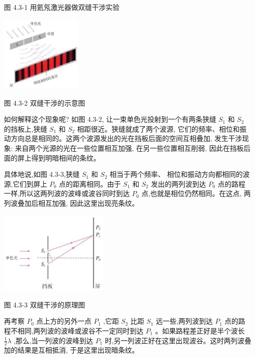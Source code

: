 \documentclass[10pt]{article}
\begin{document}
图 4.3-1 用氦氖激光器做双缝干涉实验

\begin{center}
\includegraphics[max width=0.3\textwidth]{images/01910e4c-ebb8-7d2c-8f2f-2375bc1d2d12_101_882900.jpg}
\end{center}

图 4.3-2 双缝干涉的示意图

如何解释这个现象呢? 如图 4.3-2, 让一束单色光投射到一个有两条狭缝 \({S}_{1}\) 和 \({S}_{2}\) 的挡板上,狭缝 \({S}_{1}\) 和 \({S}_{2}\) 相距很近。狭缝就成了两个波源, 它们的频率、相位和振动方向总是相同的。这两个波源发出的光在挡板后面的空间互相叠加, 发生干涉现象: 来自两个光源的光在一些位置相互加强, 在另一些位置相互削弱, 因此在挡板后面的屏上得到明暗相间的条纹。

具体地说,如图 4.3-3,狭缝 \({S}_{1}\) 和 \({S}_{2}\) 相当于两个频率、 相位和振动方向都相同的波源,它们到屏上 \({P}_{0}\) 点的距离相同。由于 \({S}_{1}\) 和 \({S}_{2}\) 发出的两列波到达 \({P}_{0}\) 点的路程一样,所以这两列波的波峰或波谷同时到达 \({P}_{0}\) 点,也就是相位仍然相同。在这点, 两列波叠加后相互加强, 因此这里出现亮条纹。

\begin{center}
\includegraphics[max width=0.4\textwidth]{images/01910e4c-ebb8-7d2c-8f2f-2375bc1d2d12_101_308251.jpg}
\end{center}

图 4.3-3 双缝干涉的原理图

再考察 \({P}_{0}\) 点上方的另外一点 \({P}_{1}\) ,它距 \({S}_{2}\) 比距 \({S}_{1}\) 远一些,两列波到达 \({P}_{1}\) 点的路程不相同,两列波的波峰或波谷不一定同时到达 \({P}_{1}\) 。如果路程差正好是半个波长 \(\frac{1}{2}\lambda\) ,那么,当一列波的波峰到达 \({P}_{1}\) 时,另一列波正好在这里出现波谷。这时两列波叠加的结果是互相抵消, 于是这里出现暗条纹。
\end{document}
